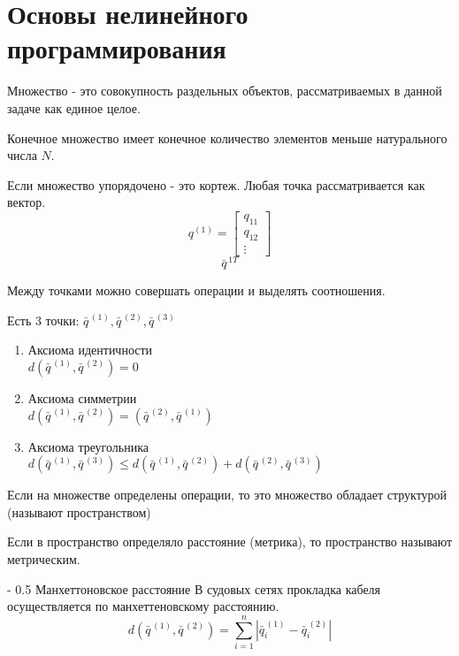 \documentclass[12pt,a5paper]{scrbook}
\makeatletter
\renewcommand\paragraph{\@startsection{paragraph}{4}{0mm}%
{-\baselineskip} %
{0.5\baselineskip} %
{\normalfont\bfseries}}%
\makeatother
\begin{document}
  \chapter{Основы нелинейного программирования}
  Множество - это совокупность раздельных объектов, рассматриваемых в данной задаче как единое целое.\par
  Конечное множество имеет конечное количество элементов меньше натурального числа $N$.\par
  Если множество упорядочено - это кортеж. Любая точка рассматривается как вектор.
  $$
    q^{(1)} =
    \begin{bmatrix}
      q_{11}\\
      q_{12}\\
      \vdots
    \end{bmatrix}
  $$
  $$\bar{q}^{\,1T}$$
  \par
  Между точками можно совершать операции и выделять соотношения.\par
  Есть 3 точки: $\bar{q}^{\,(1)}, \bar{q}^{\,(2)}, \bar{q}^{\,(3)}$
  \begin{enumerate}
    \item Аксиома идентичности\\$d(\bar{q}^{\,(1)}, \bar{q}^{\,(2)}) = 0$
    \item Аксиома симметрии\\$d(\bar{q}^{\,(1)}, \bar{q}^{\,(2)}) = (\bar{q}^{\,(2)}, \bar{q}^{\,(1)})$
    \item Аксиома треугольника\\$d(\bar{q}^{\,(1)}, \bar{q}^{\,(3)})\leq d(\bar{q}^{\,(1)}, \bar{q}^{\,(2)}) + d(\bar{q}^{\,(2)}, \bar{q}^{\,(3)})$
  \end{enumerate}
  \par
  Если на множестве определены операции, то это множество обладает структурой (называют пространством)\par
  Если в пространство определяло расстояние (метрика), то пространство называют метрическим.
  
  \paragraph{Манхеттоновское расстояние}
  В судовых сетях прокладка кабеля осуществляется по манхеттеновскому расстоянию.
  $$d \left( \bar{q}^{\,\left(1\right)}, \bar{q}^{\,\left(2\right)} \right) = \sum_{i=1}^n |\bar{q}_i^{\,\left(1\right)} - \bar{q}_i^{\,\left(2\right)}|$$
  
\end{document}
